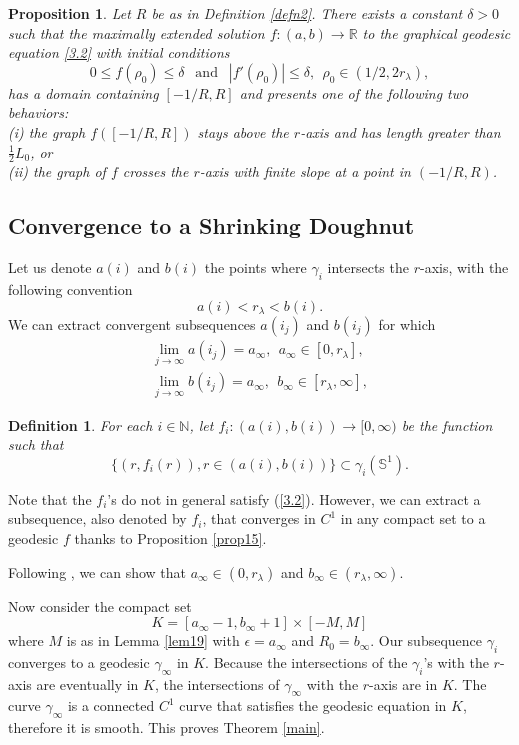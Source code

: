 \documentclass{amsart}
\theoremstyle{Corollary}
\newtheorem{prop}[theorem]{Proposition}
\newtheorem{defn}[theorem]{Definition}
\numberwithin{equation}{section}
\begin{document}
 \begin{prop}\label{prop21}
Let $R$ be as in Definition \ref{defn2}.
There exists a constant $\delta>0$ such that
the maximally extended solution $f:(a,b)\to \mathbb{R}$
to the graphical geodesic equation \eqref{3.2} with initial conditions
$$0\leq f(\rho_0)\leq\delta~~\mbox{ and }~~|f'(\rho_0)|\leq\delta,~~\rho_0\in(1/2,2r_\lambda),$$
has a domain containing $[-1/R,R]$ and presents one of the following two behaviors:\\
(i) the graph $f([-1/R,R])$ stays above the $r$-axis and has length greater than $\frac{1}{2}L_0$, or\\
(ii) the graph of $f$ crosses the $r$-axis with finite slope at a point in $(-1/R,R)$.
 \end{prop}


\subsection{Convergence to a Shrinking Doughnut}



Let us denote $a(i)$ and $b(i)$ the points where $\gamma_i$
intersects the $r$-axis,
with the following convention
$$a(i)<r_\lambda<b(i).$$
We can extract convergent subsequences $a(i_j)$ and $b(i_j)$ for which
\begin{equation*}
\begin{split}
\lim_{j\to\infty}a(i_j)=a_\infty,~~a_\infty\in [0,r_\lambda],\\
\lim_{j\to\infty}b(i_j)=a_\infty,~~b_\infty\in [r_\lambda,\infty],
\end{split}
\end{equation*}

\begin{defn}
For each $i\in\mathbb{N}$, let $f_i: (a(i),b(i))\to[0,\infty)$
be the function such that
$$\big\{(r,f_i(r)), r\in(a(i),b(i)) \big\}\subset \gamma_i(\mathbb{S}^1).$$
\end{defn}

Note that the $f_i$'s do not in general satisfy (\ref{3.2}).
However, we can extract a subsequence, also denoted by
$f_i$, that converges in $C^1$ in any compact set to a geodesic $f$ thanks to Proposition \ref{prop15}.

Following \cite[Lemmas 23 and 24]{Drugan&Nguyen}, we can show that
$a_\infty\in (0,r_\lambda)$ and $b_\infty\in (r_\lambda,\infty)$.

Now consider the compact set
$$K=[a_\infty-1,b_\infty+1]\times[-M, M]$$
where $M$ is as in Lemma \ref{lem19}
with $\epsilon=a_\infty$ and $R_0=b_\infty$.
Our subsequence
$\gamma_i$ converges to a geodesic $\gamma_\infty$ in $K$.
Because the intersections
of the $\gamma_i$'s with the $r$-axis
are eventually in $K$,
the intersections of $\gamma_\infty$ with the $r$-axis
are in $K$.
The curve $\gamma_\infty$ is a connected $C^1$ curve that
satisfies the geodesic equation in $K$,
therefore it is smooth.
This proves Theorem \ref{main}.
\end{document}
